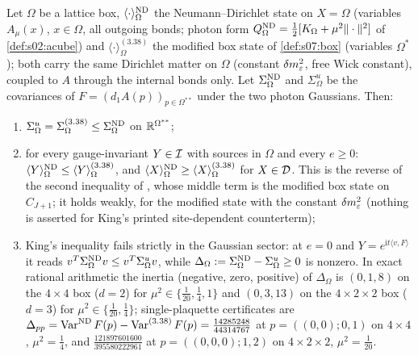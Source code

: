 \begin{lemma}\label{lem:s07:R}
Let $\Omega$ be a lattice box, $\langle\cdot\rangle^{\mathrm{ND}}_\Omega$ the Neumann--Dirichlet state on $X=\Omega$ (variables $A_\mu(x)$, $x\in\Omega$, all outgoing bonds; photon form $Q^{\mathrm{ND}}_\Omega=\frac12[K_\Omega+\mu^2\|\cdot\|^2]$ of \cref{def:s02:acube}) and $\langle\cdot\rangle^{(3.38)}_\Omega$ the modified box state of \cref{def:s07:box} (variables $\Omega^*$); both carry the same Dirichlet matter on $\Omega$ (constant $\delta m^2_{\varepsilon}$, free Wick constant), coupled to $A$ through the internal bonds only. Let $\Sigma^{\mathrm{ND}}_\Omega$ and $\Sigma^u_\Omega$ be the covariances of $F=(d_1A(p))_{p\in\Omega^{**}}$ under the two photon Gaussians. Then:
\begin{enumerate}[label=\textup{(\alph*)},nosep]
\item $\Sigma^u_\Omega=\Sigma^{(3.38)}_\Omega\le\Sigma^{\mathrm{ND}}_\Omega$ on $\mathbb R^{\Omega^{**}}$;
\item for every gauge-invariant $Y\in\mathcal I$ with sources in $\Omega$ and every $e\ge0$: $\langle Y\rangle^{\mathrm{ND}}_\Omega\le\langle Y\rangle^{(3.38)}_\Omega$, and $\langle X\rangle^{\mathrm{ND}}_\Omega\ge\langle X\rangle^{(3.38)}_\Omega$ for $X\in\mathcal D$. This is the reverse of the second inequality of \cite[(3.42)]{K2}, whose middle term is the modified box state on $C_{J+1}$; it holds weakly, for the modified state with the constant $\delta m^2_{\varepsilon}$ (nothing is asserted for King's printed site-dependent counterterm);
\item King's inequality fails strictly in the Gaussian sector: at $e=0$ and $Y=e^{\mathrm it\langle v,F\rangle}$ it reads $v^T\Sigma^{\mathrm{ND}}_\Omega v\le v^T\Sigma^u_\Omega v$, while $\Delta_\Omega:=\Sigma^{\mathrm{ND}}_\Omega-\Sigma^u_\Omega\ge0$ is nonzero. In exact rational arithmetic the inertia (negative, zero, positive) of $\Delta_\Omega$ is $(0,1,8)$ on the $4\times4$ box ($d=2$) for $\mu^2\in\{\frac1{20},\frac14,1\}$ and $(0,3,13)$ on the $4\times2\times2$ box ($d=3$) for $\mu^2\in\{\frac1{20},\frac14\}$; single-plaquette certificates are $\Delta_{pp}=\operatorname{Var}^{\mathrm{ND}}F(p)-\operatorname{Var}^{(3.38)}F(p)=\frac{14285248}{44314767}$ at $p=((0,0);0,1)$ on $4\times4$, $\mu^2=\frac14$, and $\frac{121897601600}{395580222961}$ at $p=((0,0,0);1,2)$ on $4\times2\times2$, $\mu^2=\frac1{20}$.
\end{enumerate}
\end{lemma}

